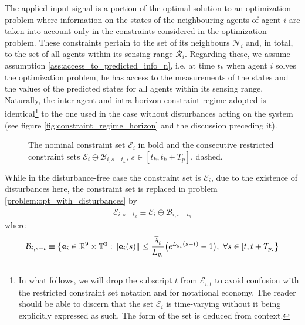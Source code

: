 The applied input signal is a portion of the optimal solution to an
optimization problem where information on the states of the neighbouring agents
of agent $i$ are taken into account only in the constraints considered in the
optimization problem. These constraints pertain to the set of its neighbours
$\mathcal{N}_i$ and, in total, to the set of all agents within its sensing
range $\mathcal{R}_i$. Regarding these, we assume assumption
\eqref{ass:access_to_predicted_info_n}, i.e. at time $t_k$ when agent $i$
solves the optimization problem, he has access to the measurements of the states
and the values of the predicted states for all agents within its sensing range.
Naturally, the inter-agent and intra-horizon constraint regime adopted is
identical\footnote{In what follows, we will drop the subscript $t$ from
$\mathcal{E}_{i,t}$ to avoid confusion with the restricted constraint set
notation and for notational economy. The reader should be able to discern that
the set $\mathcal{E}_i$ is time-varying without it being explicitly expressed as
such. The form of the set is deduced from context.} to the one used in the case
without disturbances acting on the system (see figure
\eqref{fig:constraint_regime_horizon} and the discussion preceding it).

\begin{figure}[ht!]
  \centering
  
  \caption{The nominal constraint set $\mathcal{E}_i$ in bold and the
    consecutive restricted constraint sets $\mathcal{E}_i \ominus \mathcal{B}_{i, s-t_k}$,
    $s \in [t_k, t_k + T_p]$, dashed.}
\end{figure}

While in the disturbance-free case the constraint set is $\mathcal{E}_i$,
due to the existence of disturbances here, the constraint set is replaced in
problem \eqref{problem:opt_with_disturbances} by
\begin{align}
  \mathcal{E}_{i, s-t_k} \equiv \mathcal{E}_i \ominus \mathcal{B}_{i,s-t_k}
\label{eq:restricted_constraint_set}
\end{align}
where
\begin{align}
  \mathcal{B}_{i,s-t} \equiv \big\{ \bm{\mathbf{e}}_i \in \mathbb{R}^9 \times \mathbb{T}^3 :
    \|\bm{\mathbf{e}}_i(s)\| \leq \dfrac{\overline{\delta}_i}{L_{g_i}}\big( e^{L_{g_i}(s - t)} - 1\big),\ \forall s \in [t, t + T_p] \big\}
\label{eq:b_restricted_constraint_set}
\end{align}


